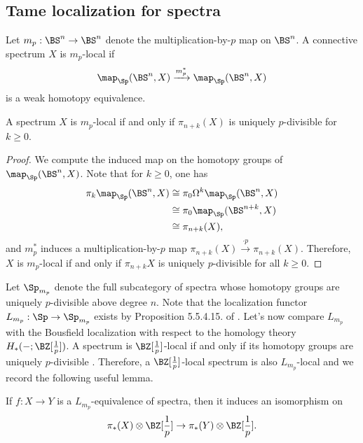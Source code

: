 \subsection{Tame localization for spectra}
Let $m_p:\BS^n\to \BS^n$ denote the multiplication-by-$p$ map on $\BS^n$. A connective spectrum $X$ is $m_p$-local if 
\[
\map_{\Sp}(\BS^n,X) \xrightarrow{m_p^*} \map_{\Sp}(\BS^n,X)
\]
is a weak homotopy equivalence.
\begin{lemma}
\label{local w.r.t. multiplication-by-p map}
	A spectrum $X$ is $m_p$-local if and only if $\pi_{n+k}(X)$ is uniquely $p$-divisible for $k\geq 0$.
\end{lemma}
\begin{proof}
	We compute the induced map on the homotopy groups of $\map_{\Sp}(\BS^n,X)$. Note that for $k\geq 0$, one has
	\begin{align*}
		\pi_k\map_{\Sp}(\BS^n,X) & \cong \pi_0 \Omega^k\map_{\Sp}(\BS^n,X)\\
		     					 & \cong \pi_0 \map_{\Sp}(\BS^{n+k},X)\\
		     					 & \cong \pi_{n+k} (X),
	\end{align*}
	and $m_p^*$ induces a multiplication-by-$p$ map $ \pi_{n+k} (X) \xrightarrow{\cdot p} \pi_{n+k} (X)$. Therefore, $X$ is $m_p$-local if and only if $\pi_{n+k}X$ is uniquely $p$-divisible for all $k\geq 0$.
	
\end{proof}
Let $\Sp_{m_p}$ denote the full subcategory of spectra whose homotopy groups are uniquely $p$-divisible above degree $n$.
Note that the localization functor $L_{m_p}:\Sp \to \Sp_{m_p}$ exists by Proposition 5.5.4.15. of \cite{HTT}.
Let's now compare $L_{m_p}$ with the Bousfield localization with respect to the homology theory $H_{*}(-;\BZ[\frac{1}{p}])$. A spectrum is $\BZ[\frac{1}{p}]$-local if and only if its homotopy groups are uniquely $p$-divisible \cite[Proposition 2.4]{BousfieldSpectra}. Therefore, a $\BZ[\frac{1}{p}]$-local spectrum is also $L_{m_p}$-local and we record the following useful lemma.
\begin{lemma}
\label{L-equivalence implies Z[1/p]-iso}
	If $f:X\to Y$ is a $L_{m_{p}}$-equivalence of spectra, then it induces an isomorphism on 
	$$
	\pi_{*}(X)\otimes \BZ[\frac{1}{p}]
	\to
	\pi_{*}(Y)\otimes \BZ[\frac{1}{p}].
	$$
\end{lemma}

